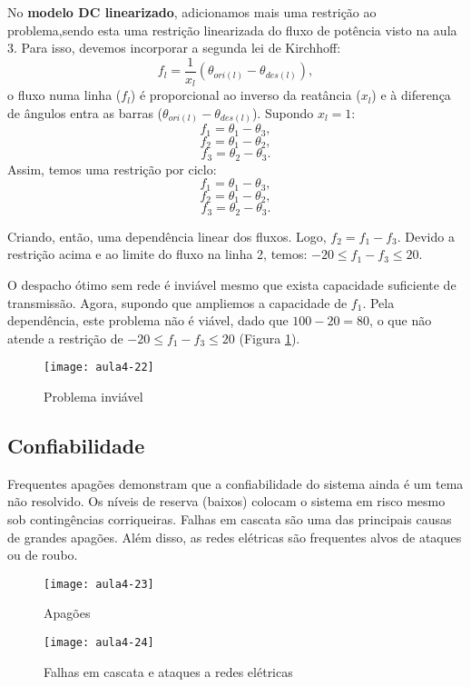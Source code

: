 No \textbf{modelo DC linearizado}, adicionamos mais uma restrição ao problema,sendo esta uma restrição linearizada do fluxo de potência visto na aula 3.
Para isso, devemos incorporar a segunda lei de Kirchhoff:
\[
	f_{l}=\frac{1}{x_{l}}(\theta_{ori(l)}-\theta_{des(l)}),
\]
o fluxo numa linha ($f_{l}$) é proporcional ao inverso da reatância ($x_{l}$) e à diferença de ângulos entra as barras ($\theta_{ori(l)}-\theta_{des(l)}$). 
Supondo $x_{l}=1$:
$$f_{1}=\theta_{1}-\theta_{3},$$
$$f_{2}=\theta_{1}-\theta_{2},$$
$$f_{3}=\theta_{2}-\theta_{3}.$$
Assim, temos uma restrição por ciclo:
$$f_{1}=\theta_{1}-\theta_{3},$$
$$f_{2}=\theta_{1}-\theta_{2},$$
$$f_{3}=\theta_{2}-\theta_{3}.$$

Criando, então, uma dependência linear dos fluxos. Logo, $f_{2}=f_{1}-f_{3}$.
Devido a restrição acima e ao limite do fluxo na linha 2, temos: $-20\leq f_{1}-f_{3} \leq 20$.

O despacho ótimo sem rede é inviável mesmo que exista capacidade suficiente
de transmissão.
Agora, supondo que ampliemos a capacidade de $f_{1}$. Pela dependência, este problema não
é viável, dado que $100-20=80$, o que não atende a restrição de $-20\leq f_{1}-f_{3}\leq20$ (Figura \ref{fig:aula4-22}).

\begin{figure}[H]
\begin{centering}
\texttt{[image: aula4-22]}\protect\caption{\label{fig:aula4-22} Problema inviável}
\end{centering}
\end{figure}

\subsection{Confiabilidade}
 Frequentes apagões demonstram que a confiabilidade do sistema ainda é um tema não resolvido. Os níveis de reserva (baixos) colocam o sistema em risco mesmo sob contingências corriqueiras.  Falhas em cascata são uma das principais causas de grandes apagões. Além disso, as redes elétricas são frequentes alvos de ataques ou de roubo.

\begin{figure}[h]
\begin{centering}
\texttt{[image: aula4-23]}\protect\caption{\label{fig:aula4-23} Apagões}
\end{centering}
\end{figure}
\begin{figure}[h]
\begin{centering}
\texttt{[image: aula4-24]}\protect\caption{\label{fig:aula4-24} Falhas em cascata e ataques a redes elétricas }
\end{centering}
\end{figure}

